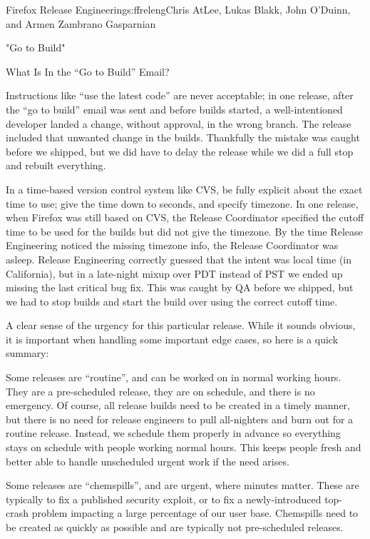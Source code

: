 \begin{aosachapter}{Firefox Release Engineering}{s:ffreleng}{Chris AtLee, Lukas Blakk, John O'Duinn, and Armen Zambrano Gasparnian}
\begin{aosasect1}{"Go to Build"}
\begin{aosasect2}{What Is In the ``Go to Build'' Email?}
\begin{aosaenumerate}
\begin{aosaenumerate2}
    \item Instructions like ``use the latest code'' are never acceptable; in one
      release, after the ``go to build'' email was sent and before
      builds started, a well-intentioned developer landed a change,
      without approval, in the wrong branch. The release included that
      unwanted change in the builds. Thankfully the mistake was
      caught before we shipped, but we did have to delay the release 
      while we did a full stop and rebuilt everything.

    \item In a time-based version control system like CVS, be fully
      explicit about the exact time to use; give the time down to seconds,
      and specify timezone. In one release, when Firefox was still
      based on CVS, the Release Coordinator specified the cutoff time
      to be used for the builds but did not give the timezone. By the
      time Release Engineering noticed the missing timezone info, the
      Release Coordinator was asleep. Release
      Engineering correctly guessed that the intent was local time (in
      California), but in a late-night mixup over PDT instead of PST
      we ended up missing the last critical bug fix. This was caught
      by QA before we shipped, but we had to stop builds and
      start the build over using the correct cutoff time.

    \end{aosaenumerate2}

\item A clear sense of the urgency for this particular release.  While
  it sounds obvious, it is important when handling some important edge
  cases, so here is a quick summary:

  \begin{aosaenumerate2}

    \item Some releases are ``routine'', and can be worked on in
      normal working hours. They are a pre-scheduled release, they are
      on schedule, and there is no emergency. Of course, all release
      builds need to be created in a timely manner, but there is no
      need for release engineers to pull all-nighters and burn out
      for a routine release.  Instead, we schedule them
      properly in advance so everything stays on schedule with people
      working normal hours. This keeps people fresh and better able to
      handle unscheduled urgent work if the need arises.

    \item Some releases are ``chemspills'', and are urgent, where minutes matter. These are
      typically to fix a published security exploit, or to fix a
      newly-introduced top-crash problem impacting a large percentage
      of our user base. Chemspills need to be created as
      quickly as possible and are typically not pre-scheduled
      releases.


\end{aosaenumerate2}
\end{aosaenumerate}
\end{aosasect2}
\end{aosasect1}
\end{aosachapter}
